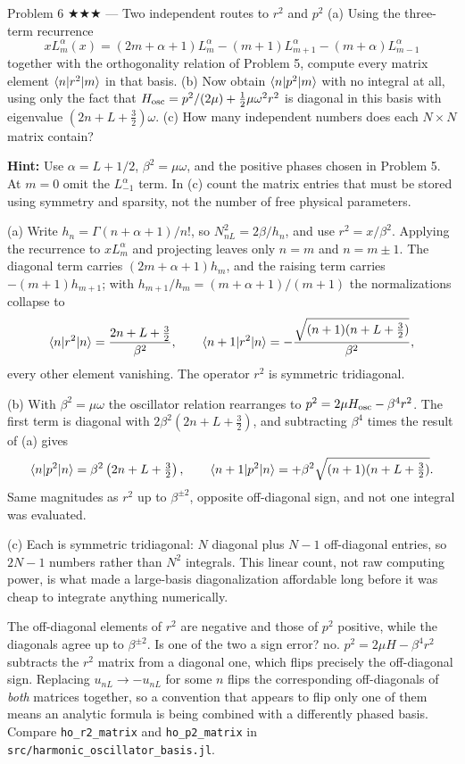 \documentclass[11pt]{article}
\begin{document}
\begin{problem}{Problem 6 ★★★ — Two independent routes to $r^2$ and $p^2$}
(a) Using the three-term recurrence
\[
xL_m^\alpha(x)=(2m+\alpha+1)L_m^\alpha-(m+1)L_{m+1}^\alpha-(m+\alpha)L_{m-1}^\alpha
\]
together with the orthogonality relation of Problem 5, compute every matrix element
$\langle n\rvert r^2\lvert m\rangle$ in that basis.
(b) Now obtain $\langle n\rvert p^2\lvert m\rangle$ with no integral at all, using only the fact
that $H_{\rm osc}=p^2/(2\mu)+\tfrac12\mu\omega^2r^2$ is diagonal in this basis
with eigenvalue $(2n+L+\tfrac32)\omega$.
(c) How many independent numbers does each $N\times N$ matrix contain?

\textbf{Hint:} Use $\alpha=L+1/2$, $\beta^2=\mu\omega$, and the positive
phases chosen in Problem 5. At $m=0$ omit the $L_{-1}^\alpha$ term.
In (c) count the matrix entries that must be stored using symmetry and
sparsity, not the number of free physical parameters.
\end{problem}
\begin{solution}
(a) Write $h_n=\Gamma(n+\alpha+1)/n!$, so $N_{nL}^2=2\beta/h_n$, and use
$r^2=x/\beta^2$. Applying the recurrence to $xL_m^\alpha$ and projecting leaves
only $n=m$ and $n=m\pm1$. The diagonal term carries $(2m+\alpha+1)h_m$, and the
raising term carries $-(m+1)h_{m+1}$; with
$h_{m+1}/h_m=(m+\alpha+1)/(m+1)$ the normalizations collapse to
\[
\langle n\rvert r^2\lvert n\rangle=\frac{2n+L+\tfrac32}{\beta^2},\qquad
\langle n+1\rvert r^2\lvert n\rangle=-\frac{\sqrt{(n+1)(n+L+\tfrac32)}}{\beta^2},
\]
every other element vanishing. The operator $r^2$ is symmetric tridiagonal.

(b) With $\beta^2=\mu\omega$ the oscillator relation rearranges to
$p^2=2\mu H_{\rm osc}-\beta^4r^2$. The first term is diagonal with
$2\beta^2(2n+L+\tfrac32)$, and subtracting $\beta^4$ times the result of (a)
gives
\[
\langle n\rvert p^2\lvert n\rangle=\beta^2\left(2n+L+\tfrac32\right),\qquad
\langle n+1\rvert p^2\lvert n\rangle=+\beta^2\sqrt{(n+1)(n+L+\tfrac32)} .
\]
Same magnitudes as $r^2$ up to $\beta^{\pm2}$, opposite off-diagonal sign, and
not one integral was evaluated.

(c) Each is symmetric tridiagonal: $N$ diagonal plus $N-1$ off-diagonal
entries, so $2N-1$ numbers rather than $N^2$ integrals. This linear count, not
raw computing power, is what made a large-basis diagonalization affordable long
before it was cheap to integrate anything numerically.
\end{solution}
\begin{quiz}
The off-diagonal elements of $r^2$ are negative and those of $p^2$ positive,
while the diagonals agree up to $\beta^{\pm2}$. Is one of the two a sign error?
\answer no. $p^2=2\mu H-\beta^4r^2$ subtracts the $r^2$ matrix from a diagonal
one, which flips precisely the off-diagonal sign. Replacing $u_{nL}\to-u_{nL}$
for some $n$ flips the corresponding off-diagonals of \emph{both} matrices
together, so a convention that appears to flip only one of them means an
analytic formula is being combined with a differently phased basis. Compare
\texttt{ho\_r2\_matrix} and \texttt{ho\_p2\_matrix} in
\texttt{src/harmonic\_oscillator\_basis.jl}.
\end{quiz}
\end{document}
